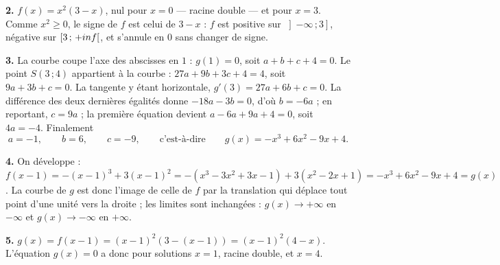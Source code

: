 \begin{corrige}
\textbf{2.} $f(x) = x^{2}(3-x)$, nul pour $x = 0$ — racine double — et pour
$x = 3$. Comme $x^{2}\geq0$, le signe de $f$ est celui de $3-x$ : $f$ est
positive sur $\left]-\infty\,;3\right]$, négative sur
$\left[3\,;\,+inf\right[$, et s'annule en $0$ sans changer de signe.

\textbf{3.} La courbe coupe l'axe des abscisses en $1$ : $g(1) = 0$, soit
$a+b+c+4 = 0$. Le point $S(3\,;4)$ appartient à la courbe :
$27a+9b+3c+4 = 4$, soit $9a+3b+c = 0$. La tangente y étant horizontale,
$g'(3) = 27a+6b+c = 0$. La différence des deux dernières égalités donne
$-18a-3b = 0$, d'où $b = -6a$ ; en reportant, $c = 9a$ ; la première équation
devient $a-6a+9a+4 = 0$, soit $4a = -4$. Finalement
\[
  a = -1, \qquad b = 6, \qquad c = -9,
  \qquad\text{c'est-à-dire}\qquad
  g(x) = -x^{3}+6x^{2}-9x+4.
\]

\textbf{4.} On développe :
$f(x-1) = -(x-1)^{3}+3(x-1)^{2}
= -\left(x^{3}-3x^{2}+3x-1\right)+3\left(x^{2}-2x+1\right)
= -x^{3}+6x^{2}-9x+4 = g(x)$. La courbe de $g$ est donc l'image de celle de
$f$ par la translation qui déplace tout point d'une unité vers la droite ;
les limites sont inchangées : $g(x)\to+\infty$ en $-\infty$ et
$g(x)\to-\infty$ en $+\infty$.

\textbf{5.} $g(x) = f(x-1) = (x-1)^{2}\left(3-(x-1)\right)
= (x-1)^{2}(4-x)$. L'équation $g(x) = 0$ a donc pour solutions $x = 1$, racine
double, et $x = 4$.
\end{corrige}
